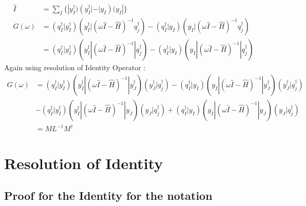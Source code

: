 \documentclass[11pt, oneside]{article}   	%
\begin{document}
\begin{equation*}\label{eq:resolution of identity}
  \begin{aligned}
    \hat I&=\sum_I \{ |y_I^\dagger)(y_I^\dagger|-|y_I)(y_I|\}\\
    G(\omega)&=(q_I^\dagger|y_I^\dagger)(y_I^\dagger|(\omega \hat I - \hat H)^{-1}q_j^\dagger) - (q_I^\dagger|y_I)(y_I|(\omega \hat I - \hat H)^{-1}q_j^\dagger)\\
    &=(q_I^\dagger|y_I^\dagger)(y_I^\dagger|(\omega \hat I - \hat H)^{-1}|q_j^\dagger) - (q_I^\dagger|y_I)(y_I|(\omega \hat I - \hat H)^{-1}|q_j^\dagger)
  \end{aligned}
\end{equation*}
Again using resolution of Identity Operator : 
\begin{equation*}\label{eq:resolution of identity}
  \begin{aligned}
    G(\omega)&=(q_I^\dagger|y_I^\dagger)(y_I^\dagger|(\omega \hat I - \hat H)^{-1}|y_J^\dagger)(y_J^\dagger|q_j^\dagger) - (q_I^\dagger|y_I)(y_I|(\omega \hat I - \hat H)^{-1}|y_J^\dagger)(y_J^\dagger|q_j^\dagger)\\
 &- (q_I^\dagger|y_I^\dagger)(y_I^\dagger|(\omega \hat I - \hat H)^{-1}|y_J)(y_J|q_j^\dagger) + (q_I^\dagger|y_I)(y_I|(\omega \hat I - \hat H)^{-1}|y_J)(y_J|q_j^\dagger)\\
    &=M L^{-1} M^\dagger
  \end{aligned}
\end{equation*}

\section{Resolution of Identity}
  \subsection{Proof for the Identity for the notation}\
\end{document}

